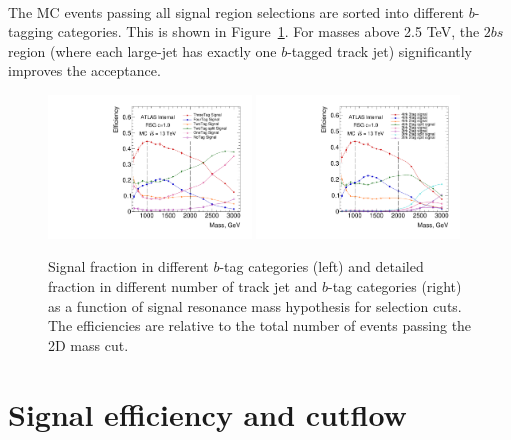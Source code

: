 \paragraph{}
The MC events passing all signal region selections are sorted into different $b$-tagging categories. This is shown in Figure~\ref{fig:boosted-nbjet-signal-efficiency}. 
For masses above 2.5 TeV, the $2bs$ region (where each large-\R jet has exactly one $b$-tagged track jet) significantly improves the acceptance.
\begin{figure}
\begin{center}
\includegraphics[width=0.48\textwidth,angle=-90]{figures/boosted/SigEff/region_lst_Moriond_Efficiency_AllTag_Signal.pdf}
\includegraphics[width=0.48\textwidth,angle=-90]{figures/boosted/SigEff/detail_lst_Moriond_Efficiency_AllTag_Signal.pdf}
  \caption{Signal fraction in different $b$-tag categories (left) and detailed fraction in different number of track jet and $b$-tag categories (right) as a function of signal resonance mass hypothesis for selection cuts. The efficiencies are relative to the total number of events passing the 2D mass cut.}
  \label{fig:boosted-nbjet-signal-efficiency}
\end{center}
\end{figure}



\section{Signal efficiency and cutflow}
